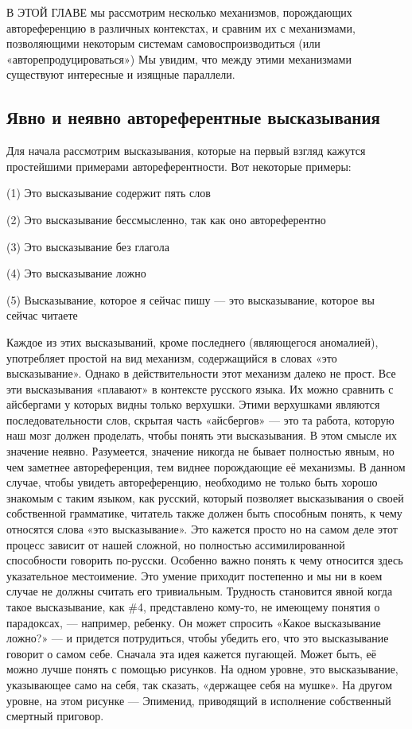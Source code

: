 \documentclass[../main.tex]{subfiles}
\begin{document}

В ЭТОЙ ГЛАВЕ мы рассмотрим несколько механизмов, порождающих автореференцию в различных контекстах, и сравним их с механизмами, позволяющими некоторым системам самовоспроизводиться (или «авторепродуцироваться») Мы увидим, что между этими механизмами существуют интересные и изящные параллели.


\subsection{Явно и неявно автореферентные высказывания}

Для начала рассмотрим высказывания, которые на первый взгляд кажутся простейшими примерами автореферентности. Вот некоторые примеры:

(1) Это высказывание содержит пять слов

(2) Это высказывание бессмысленно, так как оно автореферентно

(3) Это высказывание без глагола

(4) Это высказывание ложно

(5) Высказывание, которое я сейчас пишу --- это высказывание, которое вы сейчас читаете

Каждое из этих высказываний, кроме последнего (являющегося аномалией), употребляет простой на вид механизм, содержащийся в словах «это высказывание». Однако в действительности этот механизм далеко не прост. Все эти высказывания «плавают» в контексте русского языка. Их можно сравнить с айсбергами у которых видны только верхушки. Этими верхушками являются последовательности слов, скрытая часть «айсбергов» --- это та работа, которую наш мозг должен проделать, чтобы понять эти высказывания. В этом смысле их значение неявно. Разумеется, значение никогда не бывает полностью явным, но чем заметнее автореференция, тем виднее порождающие её механизмы. В данном случае, чтобы увидеть автореференцию, необходимо не только быть хорошо знакомым с таким языком, как русский, который позволяет высказывания о своей собственной грамматике, читатель также должен быть способным понять, к чему относятся слова «это высказывание». Это кажется просто но на самом деле этот процесс зависит от нашей сложной, но полностью ассимилированной способности говорить по-русски. Особенно важно понять к чему относится здесь указательное местоимение. Это умение приходит постепенно и мы ни в коем случае не должны считать его тривиальным. Трудность становится явной когда такое высказывание, как \#4, представлено кому-то, не имеющему понятия о парадоксах, --- например, ребенку. Он может спросить «Какое высказывание ложно?» --- и придется потрудиться, чтобы убедить его, что это высказывание говорит о самом себе. Сначала эта идея кажется пугающей. Может быть, её можно лучше понять с помощью рисунков. На одном уровне, это высказывание, указывающее само на себя, так сказать, «держащее себя на мушке». На другом уровне, на этом рисунке --- Эпименид, приводящий в исполнение собственный смертный приговор.
\end{document}

